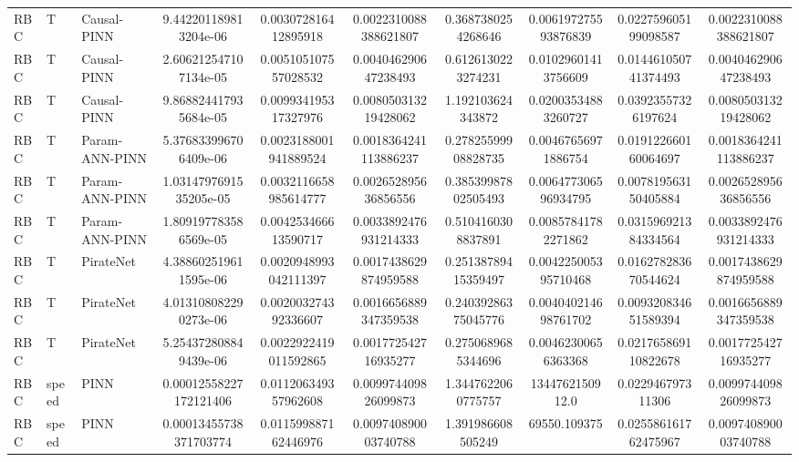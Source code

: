 \begin{landscape}
\begin{longtable}{lllccccccc}
 RBC &     T &    Causal-PINN &  9.442201189813204e-06 &   0.003072816412895918 &  0.0022310088388621807 &   0.3687380254268646 &  0.006197275593876839 &  0.022759605199098587 &  0.0022310088388621807 \\
 RBC &     T &    Causal-PINN &  2.606212547107134e-05 &   0.005105107557028532 &   0.004046290647238493 &   0.6126130223274231 &   0.01029601413756609 &  0.014461050741374493 &   0.004046290647238493 \\
 RBC &     T &    Causal-PINN &  9.868824417935684e-05 &   0.009934195317327976 &   0.008050313219428062 &    1.192103624343872 &   0.02003534883260727 &   0.03923557326197624 &   0.008050313219428062 \\
 RBC &     T & Param-ANN-PINN &  5.376833996706409e-06 &  0.0023188001941889524 &  0.0018364241113886237 &  0.27825599908828735 &   0.00467656971886754 &  0.019122660160064697 &  0.0018364241113886237 \\
 RBC &     T & Param-ANN-PINN & 1.0314797691535205e-05 &  0.0032116658985614777 &   0.002652895636856556 &  0.38539987802505493 &  0.006477306596934795 &  0.007819563150405884 &   0.002652895636856556 \\
 RBC &     T & Param-ANN-PINN &  1.809197783586569e-05 &   0.004253466613590717 &  0.0033892476931214333 &   0.5104160308837891 &   0.00857841782271862 &  0.031596921384334564 &  0.0033892476931214333 \\
 RBC &     T &      PirateNet &  4.388602519611595e-06 &  0.0020948993042111397 &  0.0017438629874959588 &  0.25138789415359497 &  0.004225005395710468 &  0.016278283670544624 &  0.0017438629874959588 \\
 RBC &     T &      PirateNet &  4.013108082290273e-06 &   0.002003274392336607 &  0.0016656889347359538 &  0.24039286375045776 &  0.004040214698761702 &  0.009320834651589394 &  0.0016656889347359538 \\
 RBC &     T &      PirateNet &  5.254372808849439e-06 &  0.0022922419011592865 &   0.001772542716935277 &   0.2750689685344696 &   0.00462300656363368 &  0.021765869110822678 &   0.001772542716935277 \\
 RBC & speed &           PINN & 0.00012558227172121406 &   0.011206349357962608 &   0.009974409826099873 &   1.3447622060775757 &       1344762150912.0 &     0.022946797311306 &   0.009974409826099873 \\
 RBC & speed &           PINN & 0.00013455738371703774 &   0.011599887162446976 &   0.009740890003740788 &    1.391986608505249 &          69550.109375 &  0.025586161762475967 &   0.009740890003740788 \\

\end{longtable}
\end{landscape}
